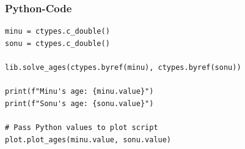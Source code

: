 \documentclass{beamer}
\begin{document}
\begin{frame}[fragile]
\frametitle{Python-Code}
\begin{lstlisting}
minu = ctypes.c_double()
sonu = ctypes.c_double()

lib.solve_ages(ctypes.byref(minu), ctypes.byref(sonu))

print(f"Minu's age: {minu.value}")
print(f"Sonu's age: {sonu.value}")

# Pass Python values to plot script
plot.plot_ages(minu.value, sonu.value)
\end{lstlisting}
\end{frame}
\end{document}
